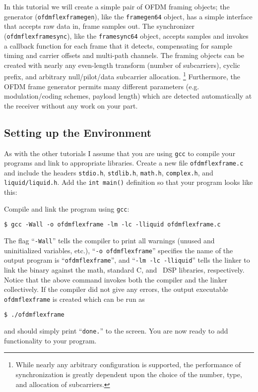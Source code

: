 In this tutorial we will create a simple pair of OFDM framing objects;
the generator ({\tt ofdmflexframegen}),
like the {\tt framegen64} object,
has a simple interface that accepts raw data in, frame samples out.
The synchronizer ({\tt ofdmflexframesync}),
like the {\tt framesync64} object,
accepts samples and invokes a callback function for each frame that it
detects,
compensating for sample timing and carrier offsets and multi-path
channels.
The framing objects can be created with nearly any even-length transform
(number of subcarriers),
cyclic prefix, and arbitrary null/pilot/data subcarrier allocation.%
\footnote{While nearly any arbitrary configuration is supported, the
          performance of synchronization is greatly dependent upon the
          choice of the number, type, and allocation of subcarriers.
          }
Furthermore, the OFDM frame generator permits many different parameters
(e.g. modulation/coding schemes, payload length)
which are detected automatically at the receiver without any work on
your part.


%
%
\subsection{Setting up the Environment}
\label{tutorial:ofdmflexframe:environment}

As with the other tutorials I assume that you are using {\tt gcc} to
compile your programs and link to appropriate libraries.
Create a new file {\tt ofdmflexframe.c} and include the headers
{\tt stdio.h},
{\tt stdlib.h},
{\tt math.h},
{\tt complex.h}, and
{\tt liquid/liquid.h}.
Add the {\tt int main()} definition so that your program looks like
this:
%

%
Compile and link the program using {\tt gcc}:
%
\begin{Verbatim}[fontsize=\small]
    $ gcc -Wall -o ofdmflexframe -lm -lc -lliquid ofdmflexframe.c
\end{Verbatim}
%
The flag ``{\tt -Wall}'' tells the compiler to print all warnings
(unused and uninitialized variables, etc.),
``{\tt -o ofdmflexframe}'' specifies the name of the output program is
``{\tt ofdmflexframe}'', and
``{\tt -lm -lc -lliquid}'' tells the linker to link the binary against
the math, standard C, and \liquid\ DSP libraries, respectively.
Notice that the above command invokes both the compiler and the linker
collectively.
%
If the compiler did not give any errors, the output executable
{\tt ofdmflexframe} is created which can be run as
%
\begin{Verbatim}[fontsize=\small]
    $ ./ofdmflexframe
\end{Verbatim}
%
and should simply print ``{\tt done.}'' to the screen.
You are now ready to add functionality to your program.



